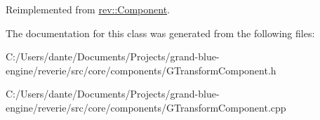 Reimplemented from \mbox{\hyperlink{classrev_1_1_component_ae2827b14c278588b95e01c4743fae674}{rev\+::\+Component}}.



The documentation for this class was generated from the following files\+:\begin{DoxyCompactItemize}
\item 
C\+:/\+Users/dante/\+Documents/\+Projects/grand-\/blue-\/engine/reverie/src/core/components/G\+Transform\+Component.\+h\item 
C\+:/\+Users/dante/\+Documents/\+Projects/grand-\/blue-\/engine/reverie/src/core/components/G\+Transform\+Component.\+cpp\end{DoxyCompactItemize}
